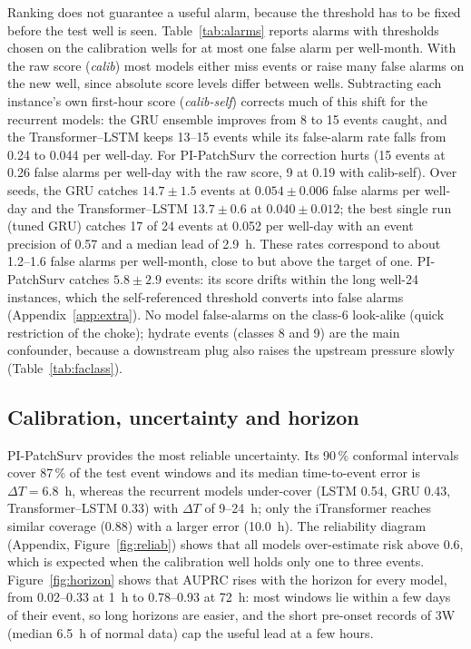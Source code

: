 Ranking does not guarantee a useful alarm, because the threshold has to be fixed before the test well is
seen. Table~\ref{tab:alarms} reports alarms with thresholds chosen on the calibration wells for at most one
false alarm per well-month. With the raw score (\emph{calib}) most models either miss events or raise many
false alarms on the new well, since absolute score levels differ between wells. Subtracting each
instance's own first-hour score (\emph{calib-self}) corrects much of this shift for the recurrent models:
the GRU ensemble improves from 8 to 15 events caught, and the Transformer--LSTM keeps 13--15 events while
its false-alarm rate falls from 0.24 to 0.044 per well-day. For PI-PatchSurv the correction hurts (15 events at
0.26 false alarms per well-day with the raw score, 9 at 0.19 with calib-self). Over seeds, the GRU catches
$14.7\pm1.5$ events at $0.054\pm0.006$ false alarms per well-day and the Transformer--LSTM $13.7\pm0.6$ at
$0.040\pm0.012$; the best single run (tuned GRU) catches 17 of 24 events at 0.052 per well-day with an event
precision of 0.57 and a median lead of 2.9~h. These rates correspond to about 1.2--1.6 false alarms per
well-month, close to but above the target of one. PI-PatchSurv catches $5.8\pm2.9$ events: its score drifts
within the long well-24 instances, which the self-referenced threshold converts into false alarms
(Appendix~\ref{app:extra}). No model false-alarms on the class-6 look-alike (quick restriction of the
choke); hydrate events (classes 8 and 9) are the main confounder, because a downstream plug also raises the
upstream pressure slowly (Table~\ref{tab:faclass}).



\subsection{Calibration, uncertainty and horizon}

PI-PatchSurv provides the most reliable uncertainty. Its 90\,\% conformal intervals cover 87\,\% of the
test event windows and its median time-to-event error is $\Delta T=6.8$~h, whereas the recurrent models
under-cover (LSTM 0.54, GRU 0.43, Transformer--LSTM 0.33) with $\Delta T$ of 9--24~h; only the
iTransformer reaches similar coverage (0.88) with a larger error (10.0~h). The reliability diagram
(Appendix, Figure~\ref{fig:reliab}) shows that all models over-estimate risk above 0.6, which is expected
when the calibration well holds only one to three events. Figure~\ref{fig:horizon} shows that AUPRC rises
with the horizon for every model, from 0.02--0.33 at 1~h to 0.78--0.93 at 72~h: most windows lie within
a few days of their event, so long horizons are easier, and the short pre-onset records of 3W (median
6.5~h of normal data) cap the useful lead at a few hours.

